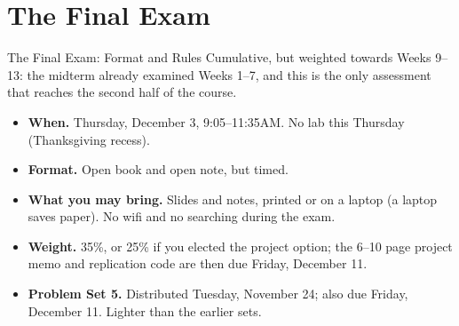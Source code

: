 \documentclass[aspectratio=169,11pt,xcolor=dvipsnames]{beamer}
\begin{document}
\section[Final Exam]{The Final Exam}
\begin{frame}\sectionpage\end{frame}

\begin{frame}{The Final Exam: Format and Rules}
Cumulative, but \alert{weighted towards Weeks 9--13}: the midterm already
examined Weeks 1--7, and this is the only assessment that reaches the second
half of the course.
\vskip6pt
\begin{itemize}\itemsep5pt
  \item \textbf{When.} Thursday, December 3, 9:05--11:35AM. No lab this Thursday (Thanksgiving
        recess).
  \item \textbf{Format.} Open book and open note, but timed.
  \item \textbf{What you may bring.} Slides and notes, printed or on a laptop (a laptop saves
        paper). No wifi and no searching during the exam.
  \item \textbf{Weight.} 35\%, or 25\% if you elected the project option; the 6--10 page project
        memo and replication code are then due Friday, December 11.
  \item \textbf{Problem Set 5.} Distributed Tuesday, November 24; also due Friday, December 11.
        Lighter than the earlier sets.
\end{itemize}
\end{frame}
\end{document}
